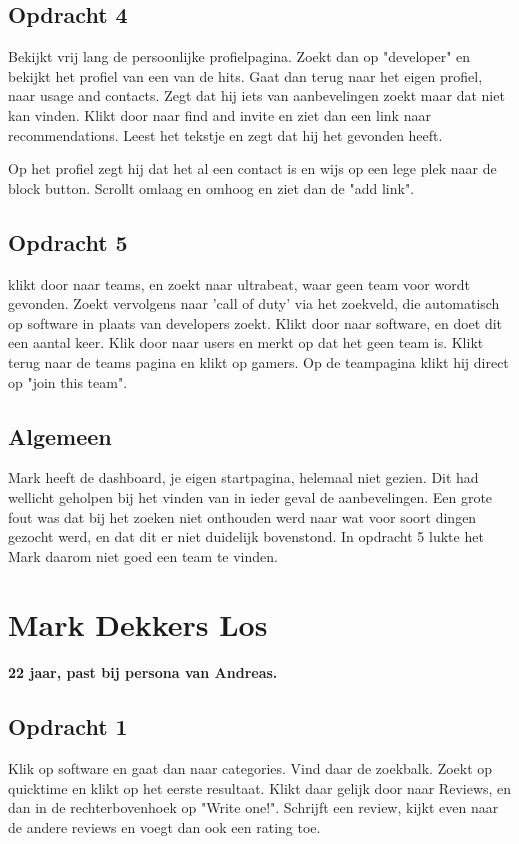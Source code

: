 \subsection{Opdracht 4}
Bekijkt vrij lang de persoonlijke profielpagina. Zoekt dan op "developer" en bekijkt het profiel van een van de hits. Gaat dan terug naar het eigen profiel, naar usage and contacts. Zegt dat hij iets van aanbevelingen zoekt maar dat niet kan vinden. Klikt door naar find and invite en ziet dan een link naar recommendations. Leest het tekstje en zegt dat hij het gevonden heeft.

Op het profiel zegt hij dat het al een contact is en wijs op een lege plek naar de block button. Scrollt omlaag en omhoog en ziet dan de "add link". 

\subsection{Opdracht 5}
klikt door naar teams, en zoekt naar ultrabeat, waar geen team voor wordt gevonden. Zoekt vervolgens naar 'call of duty' via het zoekveld, die automatisch op software in plaats van developers zoekt. Klikt door naar software, en doet dit een aantal keer. Klik door naar users en merkt op dat het geen team is. Klikt terug naar de teams pagina en klikt op gamers. Op de teampagina klikt hij direct op "join this team".

\subsection{Algemeen}
Mark heeft de dashboard, je eigen startpagina, helemaal niet gezien. Dit had wellicht geholpen bij het vinden van in ieder geval de aanbevelingen. Een grote fout was dat bij het zoeken niet onthouden werd naar wat voor soort dingen gezocht werd, en dat dit er niet duidelijk bovenstond. In opdracht 5 lukte het Mark daarom niet goed een team te vinden.

\section{Mark Dekkers Los}
\textbf{22 jaar, past bij persona van Andreas.}

\subsection{Opdracht 1}
Klik op software en gaat dan naar categories. Vind daar de zoekbalk. Zoekt op quicktime en klikt op het eerste resultaat. Klikt daar gelijk door naar Reviews, en dan in de rechterbovenhoek op "Write one!". Schrijft een review, kijkt even naar de andere reviews en voegt dan ook een rating toe.

